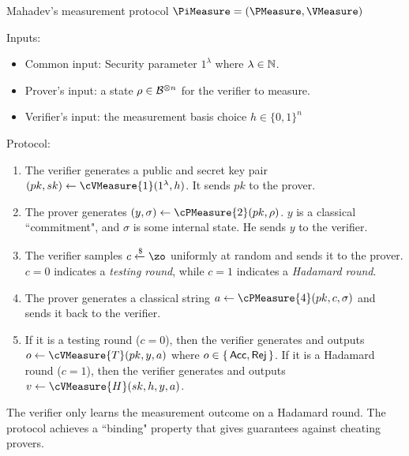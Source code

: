 
\begin{protocol}{Mahadev's measurement protocol $\PiMeasure=(\PMeasure, \VMeasure)$}
	\label{proto:urmila4}

	Inputs:
	\begin{itemize}
		\item Common input: Security parameter $1^\lambda$ where $\lambda\in\mathbb{N}$.
		\item Prover's input: a state $\rho\in\mathcal{B}^{\otimes n}$ for the verifier to measure.
		\item Verifier's input:
			the measurement basis choice $h \in \{0,1\}^n$
	\end{itemize}

	Protocol:
	\begin{enumerate}
		\item \label{step:measure1} The verifier generates a public and secret key pair $(pk, sk)\leftarrow\cVMeasure{1}(1^\lambda, h)$. It sends $pk$ to the prover.
		\item \label{step:measure2} The prover generates $(y, \sigma)\leftarrow\cPMeasure{2}(pk, \rho)$.
			$y$ is a classical ``commitment", and $\sigma$ is some internal state.
			He sends $y$ to the verifier.
		\item \label{step:measure3} The verifier samples $c\xleftarrow{\$}\zo$ uniformly at random and sends it to the prover. $c=0$ indicates a \emph{testing round}, while $c=1$ indicates a \emph{Hadamard round}.
		\item \label{step:measure4} The prover generates a classical string $a\leftarrow\cPMeasure{4}(pk, c, \sigma)$ and sends it back to the verifier.
		\item \label{step:output} If it is a testing round ($c=0$), then the verifier generates and outputs $o\leftarrow\cVMeasure{T}(pk, y, a)$ where $o\in\set{\mathsf{Acc}, \mathsf{Rej}}$.
			If it is a Hadamard round ($c=1$), then the verifier generates and outputs $v\leftarrow\cVMeasure{H}(sk, h, y, a)$.
	\end{enumerate}
\end{protocol}

The verifier only learns the measurement outcome on a Hadamard round.
The protocol achieves a ``binding" property that gives guarantees against cheating provers.


